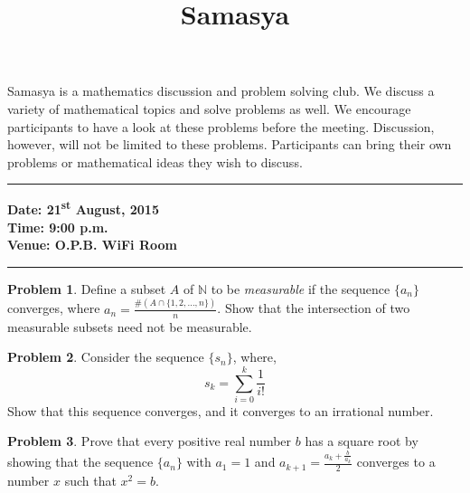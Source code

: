 \documentclass[10pt,a4paper,notitlepage]{article}
\title{\textrm{\textbf{\fontsize{30}{40}\selectfont Samasya}}}
\date{%
    }
\theoremstyle{definition}
\newtheorem{prob}{Problem}
\begin{document}
\maketitle

Samasya is a mathematics discussion and problem solving club.
We discuss a variety of mathematical topics and solve problems as well.
We encourage participants to have a look at these problems%
before the meeting.
Discussion, however, will not be limited to these problems.
Participants can bring their own problems or mathematical ideas they wish to discuss.\\
\hrule

\textbf{Date: 21\textsuperscript{st} August, 2015}%
\\
\textbf{Time: 9:00 p.m.}%
\\
\textbf{Venue: O.P.B. WiFi Room}%
\\
\hrule


\begin{prob}
Define a subset $A$ of $\mathbb{N}$ to be \emph{measurable} if the sequence $\{a_n\}$ converges, where $a_n = \frac{\#(A \cap \{1,2,\ldots,n\})}{n}$. Show that the intersection of two measurable subsets need not be measurable.
\end{prob}

\begin{prob}
Consider the sequence $\{s_n\}$, where,
$$s_k = \sum_{i=0}^{k}\frac{1}{i!}$$
Show that this sequence converges, and it converges to an irrational number.
\end{prob}

\begin{prob}
Prove that every positive real number $b$ has a square root by showing that the sequence $\{a_n\}$ with $a_{1} = 1$ and $a_{k+1} = \frac{a_k + \frac{b}{a_k}}{2}$ converges to a number $x$ such that $x^2=b$.
\end{prob}
\end{document}
